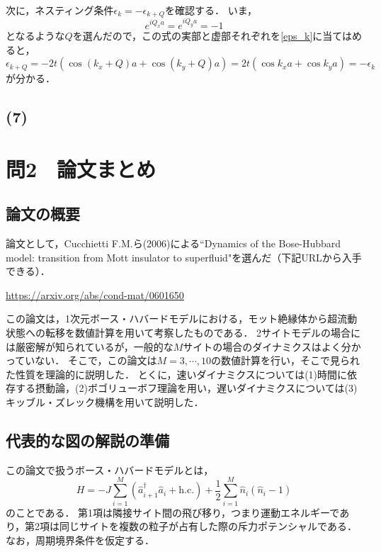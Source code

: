 \documentclass[a4paper,11pt]{jsarticle}
\begin{document}
次に，ネスティング条件$\epsilon_k = - \epsilon_{k+Q}$を確認する．
いま，
\begin{equation}
  e^{iQ_x a} = e^{iQ_y a} = -1
\end{equation}
となるような$Q$を選んだので，この式の実部と虚部それぞれを\eqref{eps_k}に当てはめると，
\begin{equation}
  \epsilon_{k+Q} = -2t(\cos{(k_x+Q)a}+\cos{(k_y+Q)a}) = 2t(\cos{k_xa}+\cos{k_ya}) = -\epsilon_k
\end{equation}
が分かる．

\subsection*{(7)}


\section*{問2　論文まとめ}

\subsection*{論文の概要}
論文として，Cucchietti F.M.ら(2006)による``Dynamics of the Bose-Hubbard model: transition from Mott insulator to superfluid"を選んだ（下記URLから入手できる）．

\begin{center}
  \url{https://arxiv.org/abs/cond-mat/0601650}
\end{center}

この論文は，1次元ボース・ハバードモデルにおける，モット絶縁体から超流動状態への転移を数値計算を用いて考察したものである．
2サイトモデルの場合には厳密解が知られているが，一般的な$M$サイトの場合のダイナミクスはよく分かっていない．
そこで，この論文は$M=3,\cdots,10$の数値計算を行い，そこで見られた性質を理論的に説明した．
とくに，速いダイナミクスについては(1)時間に依存する摂動論，(2)ボゴリューボフ理論を用い，遅いダイナミクスについては(3)キッブル・ズレック機構を用いて説明した．

\subsection*{代表的な図の解説の準備}
この論文で扱うボース・ハバードモデルとは，
\begin{equation}
  H = -J \sum_{i=1}^{M} \left(\hat{a}^{\dagger}_{i+1} \hat{a}_i + \mathrm{h.c.}\right) + \frac{1}{2}\sum_{i=1}^{M} \hat{n}_i \left(\hat{n}_i - 1\right)
\end{equation}
のことである．
第1項は隣接サイト間の飛び移り，つまり運動エネルギーであり，第2項は同じサイトを複数の粒子が占有した際の斥力ポテンシャルである．
なお，周期境界条件を仮定する．
\end{document}
